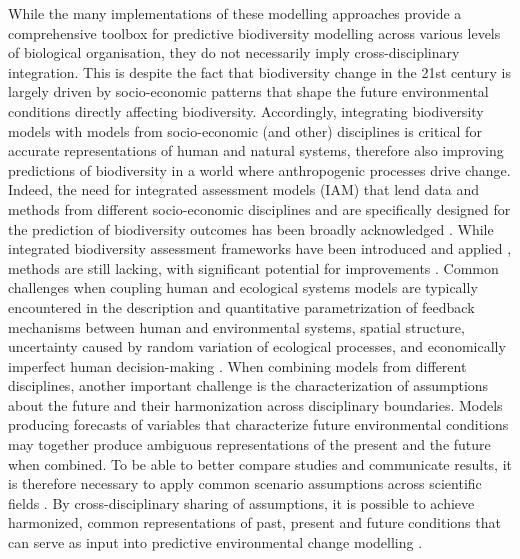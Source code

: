 \documentclass[titlesmallcaps,copyrightpage]{uomthesis}\usepackage[]{graphicx}\usepackage[]{color}
\begin{document}
While the many implementations of these modelling approaches provide a comprehensive toolbox for predictive biodiversity modelling across various levels of biological organisation, they do not necessarily imply cross-disciplinary integration. This is despite the fact that biodiversity change in the 21st century is largely driven by socio-economic patterns that shape the future environmental conditions directly affecting biodiversity. Accordingly, integrating biodiversity models with models from socio-economic (and other) disciplines is critical for accurate representations of human and natural systems, therefore also improving predictions of biodiversity in a world where anthropogenic processes drive change. Indeed, the need for integrated assessment models (IAM) that lend data and methods from different socio-economic disciplines and are specifically designed for the prediction of biodiversity outcomes has been broadly acknowledged \citep{ipbes_summary_2016, ipbes_summary_2019}. While integrated biodiversity assessment frameworks have been introduced and applied \citep{newbold2019climate, kapitza_assessing_2021, leclere_bending_2020}, methods are still lacking, with significant potential for improvements \citep{titeux_global_2017}. Common challenges when coupling human and ecological systems models are typically encountered in the description and quantitative parametrization of feedback mechanisms between human and environmental systems, spatial structure, uncertainty caused by random variation of ecological processes, and economically imperfect human decision-making \citep{drechsler_model-based_2020}. When combining models from different disciplines, another important challenge is the characterization of assumptions about the future and their harmonization across disciplinary boundaries. Models producing forecasts of variables that characterize future environmental conditions may together produce ambiguous representations of the present and the future when combined. To be able to better compare studies and communicate results, it is therefore necessary to apply common scenario assumptions across scientific fields \citep{van_vuuren_representative_2011}. By cross-disciplinary sharing of assumptions, it is possible to achieve harmonized, common representations of past, present and future conditions that can serve as input into predictive environmental change modelling \citep{hurtt_harmonization_2011}.
\end{document}
